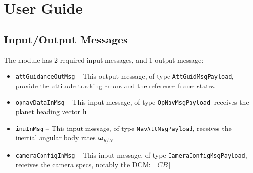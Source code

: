 
\section{User Guide}
\subsection{Input/Output Messages}
The module has 2 required input messages, and 1 output message:
\begin{itemize}
	\item {\tt attGuidanceOutMsg} -- This output message, of type {\tt AttGuidMsgPayload}, provide the attitude tracking errors and the reference frame states.
	\item {\tt opnavDataInMsg} -- This input message, of type {\tt OpNavMsgPayload}, receives the planet heading vector $\bm h$
	\item {\tt imuInMsg} -- This input message, of type {\tt NavAttMsgPayload}, receives the inertial angular body rates $\bm \omega_{B/N}$
	\item {\tt cameraConfigInMsg} -- This input message, of type {\tt CameraConfigMsgPayload}, receives the camera specs, notably the DCM: $[CB]$
\end{itemize}

